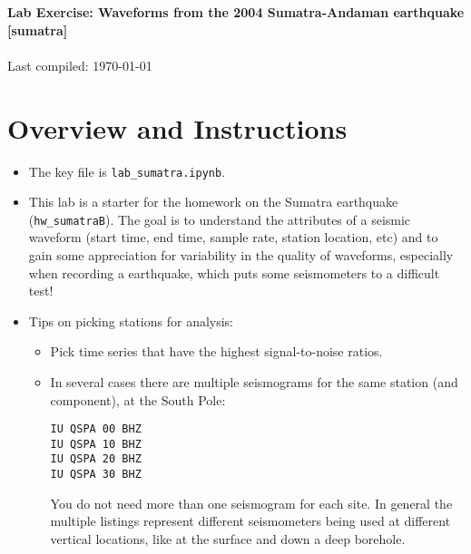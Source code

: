 \documentclass[11pt,titlepage,fleqn]{article}
\newcommand{\tfile}{{\tt lab\_sumatra.ipynb}}
\begin{document}

\begin{spacing}{1.2} 
\centering
{\large \bf Lab Exercise: Waveforms from the 2004 Sumatra-Andaman earthquake [sumatra]} \\
\cltag\ \\
Last compiled: \today
\end{spacing}

\section{Overview and Instructions}

\begin{itemize}
\item The key file is \tfile.


\item This lab is a starter for the homework on the Sumatra earthquake (\verb+hw_sumatraB+). The goal is to understand the attributes of a seismic waveform (start time, end time, sample rate, station location, etc) and to gain some appreciation for variability in the quality of waveforms, especially when recording a  earthquake, which puts some seismometers to a difficult test!


\item Tips on picking stations for analysis:
\begin{itemize}
\item Pick time series that have the highest signal-to-noise ratios.
\item In several cases there are multiple seismograms for the same station (and component), \eg at the South Pole:
%
\begin{spacing}{1.0}
\begin{verbatim}
IU QSPA 00 BHZ
IU QSPA 10 BHZ
IU QSPA 20 BHZ
IU QSPA 30 BHZ
\end{verbatim}
\end{spacing}
%
You do not need more than one seismogram for each site. In general the multiple listings represent different seismometers being used at different vertical locations, like at the surface and down a deep borehole.


\end{itemize}
\end{itemize}
\end{document}
